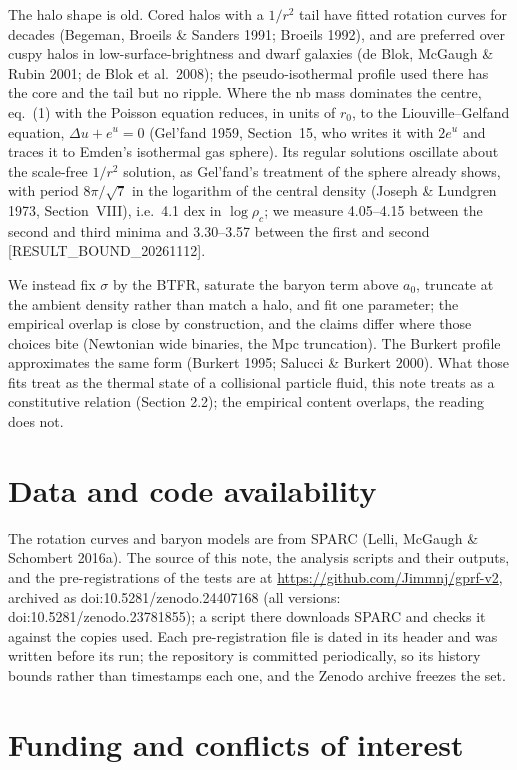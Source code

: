 \documentclass[
  10pt,
]{article}
\begin{document}
The halo shape is old. Cored halos with a $1/r^2$ tail have fitted rotation curves for decades (Begeman, Broeils \& Sanders 1991; Broeils 1992), and are preferred over cuspy halos in low-surface-brightness and dwarf galaxies (de Blok, McGaugh \& Rubin 2001; de Blok et al.~2008); the pseudo-isothermal profile used there has the core and the tail but no ripple. Where the nb mass dominates the centre, eq.~(1) with the Poisson equation reduces, in units of $r_0$, to the Liouville--Gelfand equation, $\Delta u+e^u=0$ (Gel'fand 1959, Section~15, who writes it with $2e^u$ and traces it to Emden's isothermal gas sphere). Its regular solutions oscillate about the scale-free $1/r^2$ solution, as Gel'fand's treatment of the sphere already shows, with period $8\pi/\sqrt{7}$ in the logarithm of the central density (Joseph \& Lundgren 1973, Section~VIII), i.e.\ 4.1 dex in $\log\rho_c$; we measure 4.05--4.15 between the second and third minima and 3.30--3.57 between the first and second {[}RESULT\_BOUND\_20261112{]}.

We instead fix $\sigma$ by the BTFR, saturate the baryon term above $a_0$, truncate at the ambient density rather than match a halo, and fit one parameter; the empirical overlap is close by construction, and the claims differ where those choices bite (Newtonian wide binaries, the Mpc truncation). The Burkert profile approximates the same form (Burkert 1995; Salucci \& Burkert 2000). What those fits treat as the thermal state of a collisional particle fluid, this note treats as a constitutive relation (Section 2.2); the empirical content overlaps, the reading does not.

\section{Data and code availability}\label{data-code}

The rotation curves and baryon models are from SPARC (Lelli, McGaugh \& Schombert 2016a). The source of this note, the analysis scripts and their outputs, and the pre-registrations of the tests are at \url{https://github.com/Jimmnj/gprf-v2}, archived as doi:10.5281/zenodo.24407168 (all versions: doi:10.5281/zenodo.23781855); a script there downloads SPARC and checks it against the copies used. Each pre-registration file is dated in its header and was written before its run; the repository is committed periodically, so its history bounds rather than timestamps each one, and the Zenodo archive freezes the set.

\section{Funding and conflicts of interest}
\end{document}
